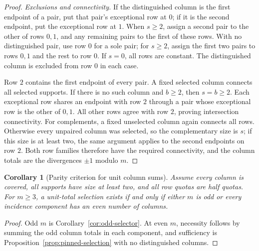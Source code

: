 \documentclass[11pt,reqno]{amsart}
\numberwithin{equation}{section}
\newtheorem{corollary}[theorem]{Corollary}
\theoremstyle{definition}
\theoremstyle{remark}
\begin{document}
\begin{proof}
\emph{Exclusions and connectivity.}
If the distinguished column is the first endpoint of a pair, put that
pair's exceptional row at $0$; if it is the second endpoint, put the
exceptional row at $1$. When $s\ge2$, assign a second pair to the other of
rows $0,1$, and any remaining pairs to the first of these rows. With no
distinguished pair, use row $0$ for a sole pair; for $s\ge2$, assign the
first two pairs to rows $0,1$ and the rest to row $0$. If $s=0$, all rows
are constant. The distinguished column is excluded from row $0$ in each case.

Row $2$ contains the first endpoint of every pair. A fixed selected column
connects all selected supports. If there is no such column and $b\ge2$,
then $s=b\ge2$. Each exceptional row shares an endpoint with row $2$
through a pair whose exceptional row is the other of $0,1$. All other rows
agree with row $2$, proving intersection connectivity.
For complements, a fixed unselected column again connects all rows.
Otherwise every unpaired column was selected, so the complementary size
is $s$; if this size is at least two, the same argument applies to the
second endpoints on row $2$. Both row families therefore have the required
connectivity, and the column totals are the divergences $\pm1$ modulo $m$.
\end{proof}


\begin{corollary}[Parity criterion for unit column sums]\label{cor:selection-criterion}
Assume every column is covered, all supports have size at least two, and
all row quotas are half quotas. For $m\ge3$, a unit-total selection exists
if and only if either $m$ is odd or every incidence component has an even
number of columns.
\end{corollary}
\begin{proof}
Odd $m$ is Corollary~\ref{cor:odd-selector}. At even $m$, necessity follows
by summing the odd column totals in each component, and sufficiency is
Proposition~\ref{prop:pinned-selection} with no distinguished columns.
\end{proof}
\end{document}
